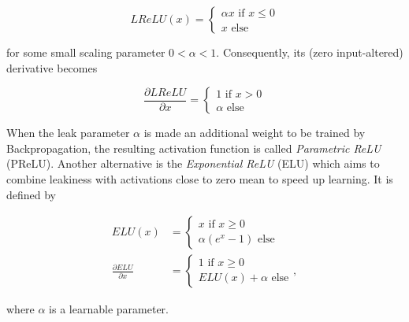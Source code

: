 \[  LReLU(x) = \begin{cases}
			\alpha x \text{ if } x \leq 0\\
			x \text{ else}
		 \end{cases}
\]

\noindent for some small scaling parameter $0 < \alpha < 1$. Consequently, its (zero input-altered) derivative becomes

\[ \frac{\partial LReLU}{\partial x} = \begin{cases}
							1 \text { if } x > 0\\
							\alpha \text{ else}
						        \end{cases}
\]

\noindent When the leak parameter $\alpha$ is made an additional weight to be trained by Backpropagation, the resulting activation function is called \textit{Parametric ReLU} (PReLU). \cite{rectifiers} Another alternative is the \textit{Exponential ReLU} (ELU) \cite{elu} which aims to combine leakiness with activations close to zero mean to speed up learning. It is defined by

\begin {align}
	ELU(x) &= \begin{cases}
			x \text { if } x \geq 0\\
			\alpha(e^x - 1) \text{ else}
		     \end{cases}\\
	\frac{\partial ELU}{\partial x} &= \begin{cases}
								1 \text { if } x \geq 0\\
								ELU(x) + \alpha \text{ else}
		    				     \end{cases},
\end {align}

\noindent where $\alpha$ is a learnable parameter.


